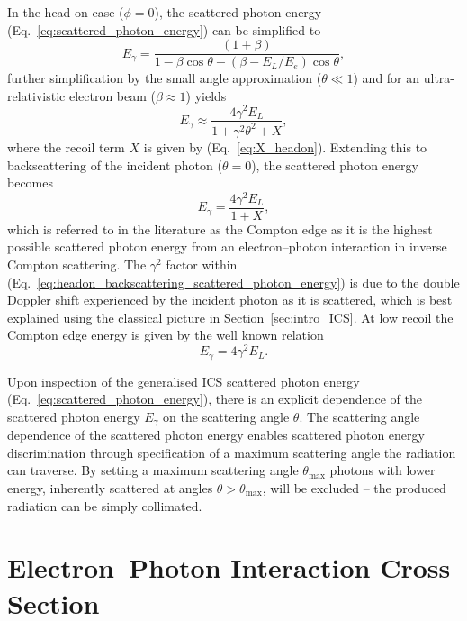 \documentclass[../main.tex]{subfiles}
\begin{document}
In the head-on case ($\phi=0$), the scattered photon energy (Eq.~\ref{eq:scattered_photon_energy}) can be simplified to 
\begin{equation}
E_{\gamma} = \frac{\left(1+\beta\right)}{1-\beta\cos\theta-\left(\beta-E_{L}/E_{e}\right)\cos\theta},
\label{eq:headon_scattered_photon_energy}
\end{equation}
further simplification by the small angle approximation ($\theta \ll 1$) and for an ultra-relativistic electron beam ($\beta \approx 1$) yields
\begin{equation}
E_{\gamma} \approx \frac{4\gamma^{2}E_{L}}{1+\gamma^{2}\theta^{2}+X},   
\label{eq:small_angle_scattered_photon_energy}
\end{equation}
where the recoil term $X$ is given by (Eq.~\ref{eq:X_headon}). Extending this to backscattering of the incident photon ($\theta = 0$), the scattered photon energy becomes
\begin{equation}
E_{\gamma} = \frac{4\gamma^{2}E_{L}}{1+X},
\label{eq:headon_backscattering_scattered_photon_energy}
\end{equation}
which is referred to in the literature \cite{krafft2010compton} as the Compton edge as it is the highest possible scattered photon energy from an electron--photon interaction in inverse Compton scattering. The $\gamma^{2}$ factor within (Eq.~\ref{eq:headon_backscattering_scattered_photon_energy}) is due to the double Doppler shift experienced by the incident photon as it is scattered, which is best explained using the classical picture in Section~\ref{sec:intro_ICS}. At low recoil the Compton edge energy is given by the well known relation
\begin{equation}
E_{\gamma} = 4\gamma^{2}E_{L}.
\label{eq:compton_edge_energy}    
\end{equation}

Upon inspection of the generalised ICS scattered photon energy (Eq.~\ref{eq:scattered_photon_energy}), there is an explicit dependence of the scattered photon energy $E_{\gamma}$ on the scattering angle $\theta$. The scattering angle dependence of the scattered photon energy enables scattered photon energy discrimination through specification of a maximum scattering angle the radiation can traverse. By setting a maximum scattering angle $\theta_{\mathrm{max}}$ photons with lower energy, inherently scattered at angles $\theta > \theta_{\mathrm{max}}$, will be excluded -- the produced radiation can be simply collimated.   

\section{Electron--Photon Interaction Cross Section}
\label{sec:electron_photon_interaction_cross_section}
\end{document}

